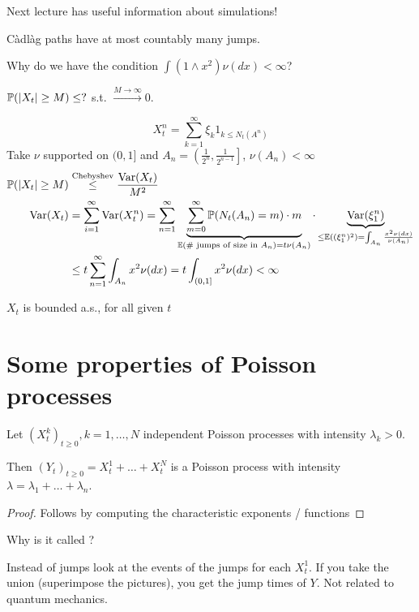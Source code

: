 Next lecture has useful information about simulations!


\begin{remark}
    Càdlàg paths have at most countably many jumps.
\end{remark}

Why do we have the condition $\int (1\land x^2)\nu(dx)<\infty$?

$\mathbb{P}(|X_t|\geq M)\leq ?$ s.t. $\stackrel{M\to\infty}{\to} 0$. 

\[X_t^n=\sum_{k=1}^{\infty} \xi_k 1_{k\leq N_t(A^n)}\]
Take $\nu$ supported on $(0,1]$ and $A_n=\left(\frac{1}{2^n},\frac{1}{2^{n-1}}\right]$, $\nu(A_n)<\infty$
\begin{align*}
    \mathbb{P}(|X_t|\geq M)&\stackrel{\text{Chebyshev}}{\leq} \frac{\text{Var}(X_t)}{M^2}\\
    \text{Var}(X_t)&=\sum_{i=1}^\infty\text{Var}(X_t^n)=\sum_{n=1}^\infty\underbrace{\sum_{m=0}^\infty \mathbb{P}(N_t(A_n)=m)\cdot m}_{\mathbb{E}(\#\text{ jumps of size in }A_n)=t\nu(A_n)} \cdot \underbrace{\text{Var}(\xi_1^n)}_{\leq \mathbb{E}((\xi_1^n)^2)=\int_{A_n}\frac{x^2\nu(dx)}{\nu(A_n)}}\\
    &\leq t\sum_{n=1}^\infty \int_{A_n} x^2\nu(dx)=t\int_{(0,1]}x^2 \nu(dx)<\infty
\end{align*}

$X_t$ is bounded a.s., for all given $t$

\section{Some properties of Poisson processes}

\begin{lemma}[Superposition]\label{lem:4.8}
    Let $(X_t^k)_{t\geq 0},k=1,\dots,N$ independent Poisson processes with intensity $\lambda_k>0$.

    Then $(Y_t)_{t\geq 0}=X_t^1+\dots+X_t^N$ is a Poisson process with intensity $\lambda=\lambda_1+\dots+\lambda_n$.
\end{lemma}

\begin{proof}
    Follows by computing the characteristic exponents / functions
\end{proof}

\begin{aremark}
    Why is it called ?

    Instead of jumps look at the events of the jumps for each $X_t^1$. If you take the union (superimpose the pictures), you get the jump times of $Y$. Not related to quantum mechanics.
\end{aremark}

